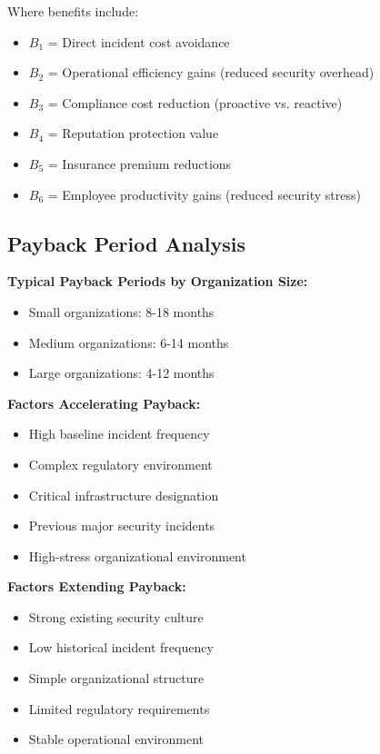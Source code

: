 \documentclass[11pt,a4paper]{article}
\begin{document}
Where benefits include:
\begin{itemize}
\item $B_1$ = Direct incident cost avoidance
\item $B_2$ = Operational efficiency gains (reduced security overhead)
\item $B_3$ = Compliance cost reduction (proactive vs. reactive)
\item $B_4$ = Reputation protection value
\item $B_5$ = Insurance premium reductions
\item $B_6$ = Employee productivity gains (reduced security stress)
\end{itemize}

\subsection{Payback Period Analysis}

\textbf{Typical Payback Periods by Organization Size:}
\begin{itemize}
\item Small organizations: 8-18 months
\item Medium organizations: 6-14 months
\item Large organizations: 4-12 months
\end{itemize}

\textbf{Factors Accelerating Payback:}
\begin{itemize}
\item High baseline incident frequency
\item Complex regulatory environment
\item Critical infrastructure designation
\item Previous major security incidents
\item High-stress organizational environment
\end{itemize}

\textbf{Factors Extending Payback:}
\begin{itemize}
\item Strong existing security culture
\item Low historical incident frequency
\item Simple organizational structure
\item Limited regulatory requirements
\item Stable operational environment
\end{itemize}
\end{document}
